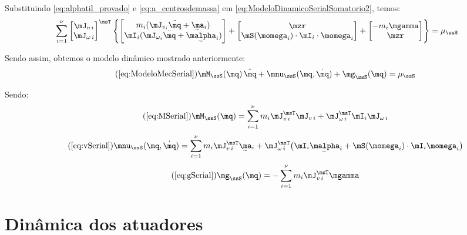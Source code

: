 \documentclass[]{politex}
\begin{document}
Substituindo \eqref{eq:alphatil_provado} e  \eqref{eq:a_centrosdemassa} em \eqref{eq:ModeloDinamicoSerialSomatorio2}, temos:
\begin{equation}
\sum_{i=1}^\nu
\begin{bmatrix}
\mJ_{v\,i} \\
\mJ_{\omega\,i}
\end{bmatrix}^\msT
\begin{Bmatrix}
\begin{bmatrix}
m_i (\mJ_{v_i} \ddot{\mq} + \underaccent{\sim}{\ma}_i   )  \\
 \mI_i (\mJ_{\omega_i} \ddot{\mq} + \underaccent{\sim}{\malpha}_i )
\end{bmatrix}
+
\begin{bmatrix}
\mzr \\
\mS( \momega_i ) \cdot \mI_i \cdot \momega_i
\end{bmatrix}
+
\begin{bmatrix}
-m_i \mgamma \\
\mzr
\end{bmatrix}
\end{Bmatrix}
=\mu_\ssS
\end{equation}

Sendo assim, obtemos o modelo dinâmico mostrado anteriormente:
\begin{equation} \tag{\ref{eq:ModeloMecSerial}}
\mM_\ssS(\mq) \, \ddot{\mq} + \mnu_\ssS(\mq,\dot{\mq}) + \mg_\ssS(\mq) = \mu_\ssS
\end{equation}

Sendo:
\begin{equation} \tag{\ref{eq:MSerial}}
\mM_\ssS(\mq) = \sum_{i=1}^\nu
m_i \mJ_{v\,i}^\msT \mJ_{v\,i} + \mJ_{\omega\,i}^\msT \mI_i \mJ_{\omega\,i}
\end{equation}
\begin{equation} \tag{\ref{eq:vSerial}}
\mnu_\ssS(\mq, \dot{\mq}) = \sum_{i=1}^\nu
 m_i \mJ_{v\,i}^\msT \underaccent{\sim}{\ma}_i + \mJ_{\omega\,i}^\msT \big( \mI_i \underaccent{\sim}{\malpha}_i + \mS( \momega_i ) \cdot \mI_i  \momega_i \big)
\end{equation}
\begin{equation} \tag{\ref{eq:gSerial}}
\mg_\ssS(\mq) = - \sum_{i=1}^\nu m_i \mJ_{v\,i}^\msT \mgamma
\end{equation}

\section{Dinâmica dos atuadores}
\end{document}
